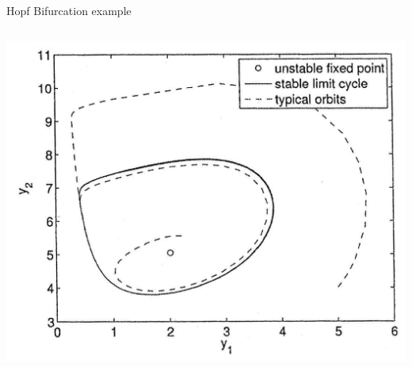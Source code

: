 \documentclass{beamer}
\begin{document}
\begin{frame}[t]{Hopf Bifurcation example}
\begin{columns}
         \includegraphics[width=\textwidth]{grafik/phase}
     \end{columns}
\end{frame}

\end{document}

